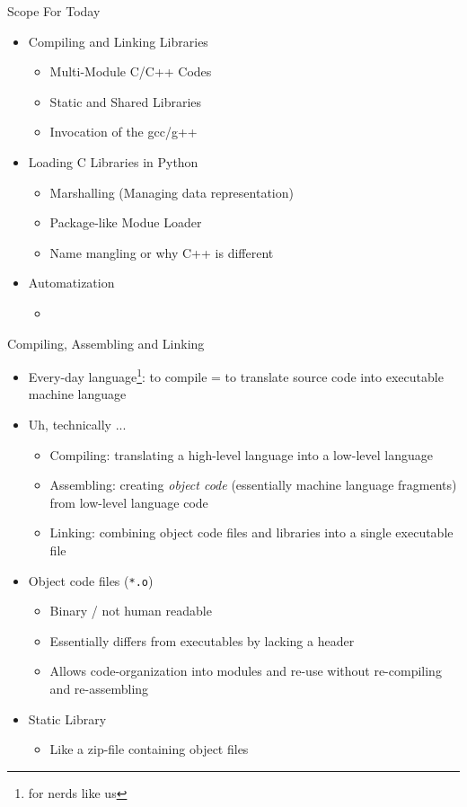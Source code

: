 \begin{frame}{Scope For Today}
%
\begin{itemize}
\item Compiling and Linking Libraries
	\begin{itemize}
	\item Multi-Module C/C++ Codes
	\item Static and Shared Libraries
	\item Invocation of the gcc/g++
	\end{itemize}
\item Loading C Libraries in Python
	\begin{itemize}
	\item Marshalling (Managing data representation)
	\item Package-like Modue Loader
	\item Name mangling or why C++ is different
	\end{itemize}
\item Automatization
	\begin{itemize}
	\item {}
	\end{itemize}
\end{itemize}
%
\end{frame}


\begin{frame}{Compiling, Assembling and Linking}
%
\begin{itemize}
\item Every-day language\footnote{for nerds like us}: to compile = to translate source code into executable machine language
\item Uh, technically ...
	\begin{itemize}
	\item Compiling: translating a high-level language into a low-level language
	\item Assembling: creating \emph{object code} (essentially machine language fragments) from low-level language code
	\item Linking: combining object code files and libraries into a single executable file
	\end{itemize}
\item Object code files (\texttt{*.o})
	\begin{itemize}
	\item Binary / not human readable
	\item Essentially differs from executables by lacking a header
	\item Allows code-organization into modules and re-use without re-compiling and re-assembling
	\end{itemize}
\item Static Library
	\begin{itemize}
	\item Like a zip-file containing object files
	\end{itemize}
\end{itemize}
%
\end{frame}

